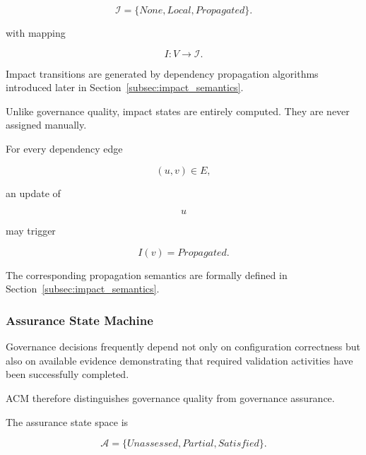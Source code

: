 \documentclass[10pt]{article}
\begin{document}
\begin{equation}
\mathcal{I}
=
\{
None,
Local,
Propagated
\}.
\label{eq:impact_state}
\end{equation}

with mapping

\begin{equation}
I
:
V
\rightarrow
\mathcal{I}.
\label{eq:mapping_impact_state}
\end{equation}

Impact transitions are generated by dependency propagation algorithms
introduced later in Section~\ref{subsec:impact_semantics}.

Unlike governance quality, impact states are entirely computed.
They are never assigned manually.

For every dependency edge

\begin{equation}
(u,v)\in E,
\label{eq:uv_definition}
\end{equation}

an update of

\begin{equation}
u
\label{eq:u_definition}
\end{equation}

may trigger

\begin{equation}
I(v)=Propagated.
\label{eq:uv_propagation}
\end{equation}

The corresponding propagation semantics are formally defined in
Section~\ref{subsec:impact_semantics}.

\subsubsection{Assurance State Machine}

Governance decisions frequently depend not only on configuration correctness
but also on available evidence demonstrating that required validation
activities have been successfully completed.

ACM therefore distinguishes governance quality from governance assurance.

The assurance state space is

\begin{equation}
\mathcal{A}
=
\{
Unassessed,
Partial,
Satisfied
\}.
\label{eq:assurance_state}
\end{equation}
\end{document}

